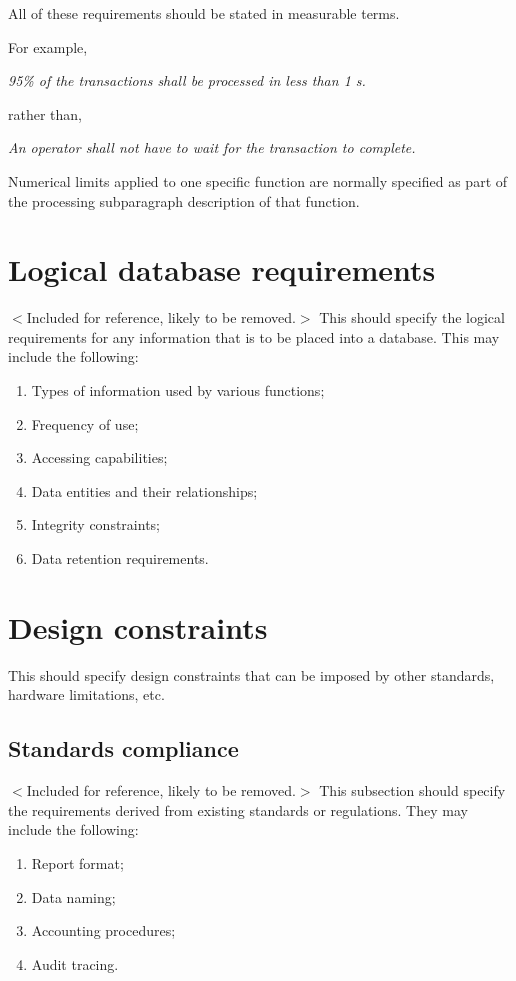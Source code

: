 \documentclass{scrreprt}
\begin{document}
All of these requirements should be stated in measurable terms.

For example,

\textit{95\% of the transactions shall be processed in less than 1 s.}

rather than,

\textit{An operator shall not have to wait for the transaction to complete.}

Numerical limits applied to one specific function are normally specified as part
of the processing subparagraph description of that function.

\section{Logical database requirements}
$<$Included for reference, likely to be removed.$>$
This should specify the logical requirements for any information that is to be
placed into a database. This may include the following:

\begin{enumerate}
	\item Types of information used by various functions;
	\item Frequency of use;
	\item Accessing capabilities;
	\item Data entities and their relationships;
	\item Integrity constraints;
	\item Data retention requirements.
\end{enumerate}

\section{Design constraints}
This should specify design constraints that can be imposed by other standards,
hardware limitations, etc.


\subsection{Standards compliance}
$<$Included for reference, likely to be removed.$>$
This subsection should specify the requirements derived from existing standards
or regulations. They may include the following:

\begin{enumerate}
	\item Report format;
	\item Data naming;
	\item Accounting procedures;
	\item Audit tracing.
\end{enumerate}
\end{document}
